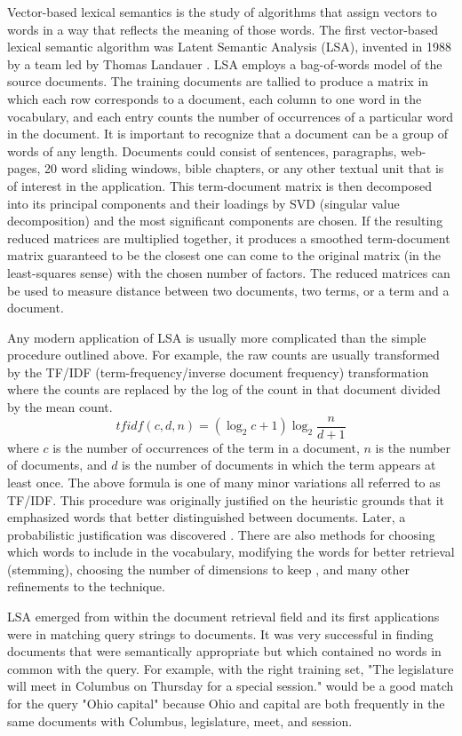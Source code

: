 Vector-based lexical semantics is the study of algorithms that assign vectors to 
words in a way that reflects the meaning of those words. The first vector-based 
lexical semantic algorithm was Latent Semantic Analysis (LSA), invented in 
1988 by a team led by Thomas Landauer \citep{Dumais1988}. LSA employs a bag-of-words model of 
the source documents. The training documents are tallied to produce a matrix in which each 
row corresponds to a document, each column to one word in the vocabulary, and 
each entry counts the number of occurrences of a particular word in the 
document. It is important to recognize that a document can be a group of words 
of any length. Documents could consist of sentences, paragraphs, web-pages, 20 
word sliding windows, bible chapters, or any other textual unit that is of 
interest in the application. This term-document matrix is then decomposed into 
its principal components and their loadings by SVD (singular value 
decomposition) and the most significant components are chosen. If the resulting 
reduced matrices are multiplied together, it produces a smoothed term-document 
matrix guaranteed to be the closest one can come to the original matrix (in the 
least-squares sense) with the chosen number of factors. The reduced matrices
can be used to measure distance between two documents, two terms, or a term and
a document.

Any modern application of LSA is usually more complicated than the simple 
procedure outlined above. For example, the raw 
counts are usually transformed by the TF/IDF (term-frequency/inverse document 
frequency) transformation where the counts are replaced by the log of the count 
in that document divided by the mean count. 
%
\[tfidf(c,d,n)=\left(\log_2{c+1}\right) \log_2{\frac{n}{d+1}}\]
%
where $c$ is the number of occurrences of the term in a document, $n$ is the 
number of documents, and $d$ is the number of documents in which the term 
appears at least once. The above formula is one of many minor variations 
all referred to as TF/IDF. This procedure was originally justified on the 
heuristic grounds that it emphasized words that better distinguished 
between documents. 
Later, a probabilistic justification was discovered \citep{Hiemstra2000}. There 
are also methods for choosing which words to include in the vocabulary, 
modifying the words for better retrieval (stemming), 
choosing the number of dimensions to keep \citep{Fernandes2011}, and many other 
refinements to the technique.

LSA emerged from within the document retrieval field and its first applications were in 
matching query strings to documents. It was very successful in finding documents 
that were semantically appropriate but which contained no words in common with 
the query. For example, with the right training set, "The legislature will meet 
in Columbus on Thursday for a special session." would be a good match for the 
query "Ohio capital" because Ohio and capital are both frequently in the same 
documents with Columbus, legislature, meet, and session.

